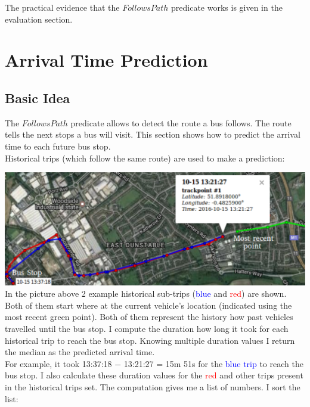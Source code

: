 \documentclass[12pt,a4paper,oneside,openright]{report}
\begin{document}
The practical evidence that the $FollowsPath$ predicate works is given in the
evaluation section.

\newpage

\section{Arrival Time Prediction}

\subsection{Basic Idea}

The $FollowsPath$ predicate allows to detect the route a bus follows.
The route tells the next stops a bus will visit. This section shows how to
predict the arrival time to each future bus stop. \\

Historical trips (which follow the same route) are used to make a prediction:

\includegraphics[width=\textwidth]{figs/future_stop.png} \\

In the picture above 2 example historical sub-trips (\textcolor{blue}{blue}
and \textcolor{red}{red}) are shown.
Both of them start where at the current vehicle's location (indicated
using the most recent green point). Both of them represent the history how past
vehicles travelled until the bus stop. I compute the duration how long it
took for each historical trip to reach the bus stop. Knowing multiple duration values
I return the median as the predicted arrival time. \\

For example, it took 13:37:18 $-$ 13:21:27 = 15m 51s for the
\textcolor{blue}{blue trip} to reach the bus stop. I also calculate these
duration values for the \textcolor{red}{red} and other trips present in the
historical trips set. The computation gives me a list of numbers.
I sort the list:

\:
\:
\end{document}
